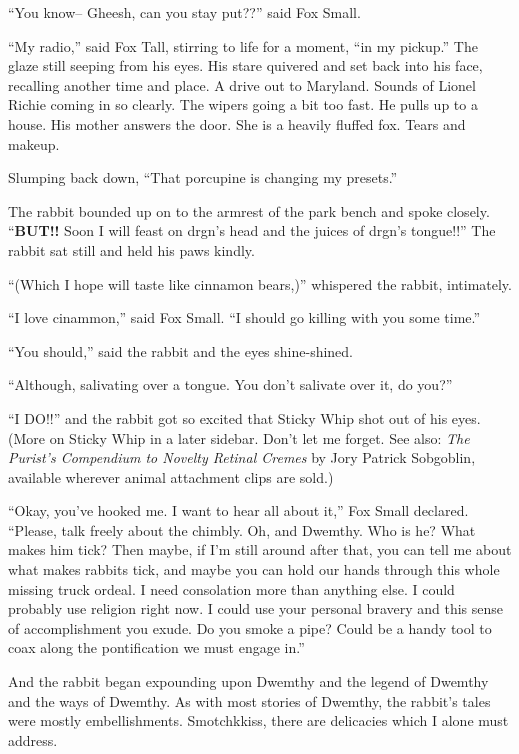 \documentclass[10pt,twoside]{report}
\begin{document}
``You know-- Gheesh, can you stay put??'' said Fox Small.

``My radio,'' said Fox Tall, stirring to life for a moment, ``in my
        pickup.''  The glaze still seeping from his eyes.  His stare
        quivered and set back into his face, recalling another time
        and place.  A drive out to Maryland.  Sounds of Lionel Richie
        coming in so clearly.  The wipers going a bit too fast.  He
        pulls up to a house.  His mother answers the door. She is a
        heavily fluffed fox.  Tears and makeup.

Slumping back down, ``That porcupine is changing my presets.''

The rabbit bounded up on to the armrest of the park bench and spoke
closely.  ``{\bf BUT!!} Soon I will feast on drgn's head and the
juices of drgn's tongue!!''  The rabbit sat still and held his paws
kindly.

``(Which I hope will taste like cinnamon bears,)'' whispered the
rabbit, intimately.

``I love cinammon,'' said Fox Small.  ``I should go killing with you
some time.''

``You should,'' said the rabbit and the eyes shine-shined.

``Although, salivating over a tongue.  You don't salivate over it, do
you?''

``I DO!!'' and the rabbit got so excited that Sticky Whip shot out of
his eyes.  (More on Sticky Whip in a later sidebar. Don't let me
forget.  See also: {\em The Purist's Compendium to Novelty Retinal
  Cremes} by Jory Patrick Sobgoblin, available wherever animal
attachment clips are sold.)

``Okay, you've hooked me.  I want to hear all about it,'' Fox Small
declared. ``Please, talk freely about the chimbly.  Oh, and Dwemthy.
Who is he?  What makes him tick?  Then maybe, if I'm still around
after that, you can tell me about what makes rabbits tick, and maybe
you can hold our hands through this whole missing truck ordeal. I need
consolation more than anything else.  I could probably use religion
right now.  I could use your personal bravery and this sense of
accomplishment you exude.  Do you smoke a pipe?  Could be a handy tool
to coax along the pontification we must engage in.''

And the rabbit began expounding upon Dwemthy and the legend of Dwemthy
and the ways of Dwemthy. As with most stories of Dwemthy, the rabbit's
tales were mostly embellishments. Smotchkkiss, there are delicacies
which I alone must address.
\end{document}
